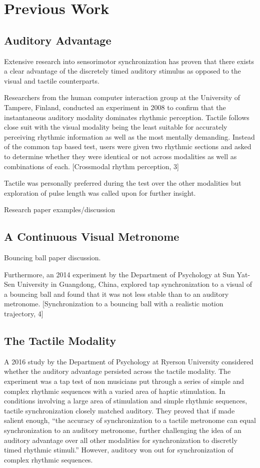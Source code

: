 \chapter{Previous Work}
\section{Auditory Advantage}
Extensive research into sensorimotor synchronization has proven that there exists a clear advantage of the discretely timed auditory stimulus as opposed to the visual and tactile counterparts. 

Researchers from the human computer interaction group at the University of Tampere, Finland, conducted an experiment in 2008 to confirm that the instantaneous auditory modality dominates rhythmic perception. Tactile follows close suit with the visual modality being the least suitable for accurately perceiving rhythmic information as well as the most mentally demanding. Instead of the common tap based test, users were given two rhythmic sections and asked to determine whether they were identical or not across modalities as well as combinations of each. [Crossmodal rhythm perception, 3]

Tactile was personally preferred during the test over the other modalities but exploration of pulse length was called upon for further insight. 



Research paper examples/discussion


\section{A Continuous Visual Metronome}
Bouncing ball paper discussion.

Furthermore, an 2014 experiment by the Department of Psychology at Sun Yat-Sen University in Guangdong, China, explored tap synchronization to a visual of a bouncing ball and found that it was not less stable than to an auditory metronome. [Synchronization to a bouncing ball with a realistic motion trajectory, 4]


\section{The Tactile Modality}
A 2016 study by the Department of Psychology at Ryerson University considered whether the auditory advantage persisted across the tactile modality. The experiment was a tap test of non musicians put through a series of simple and complex rhythmic sequences with a varied area of haptic stimulation. In conditions involving a large area of stimulation and simple rhythmic sequences, tactile synchronization closely matched auditory. They proved that if made salient enough, “the accuracy of synchronization to a tactile metronome can equal synchronization to an auditory metronome, further challenging the idea of an auditory advantage over all other modalities for synchronization to discretly timed rhythmic stimuli.” However, auditory won out for synchronization of complex rhythmic sequences.

